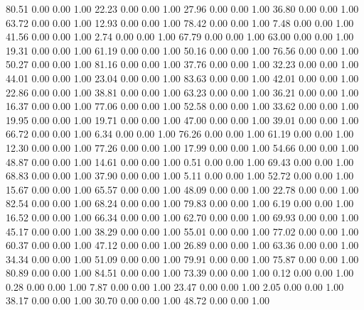    80.51   0.00   0.00   1.00
   22.23   0.00   0.00   1.00
   27.96   0.00   0.00   1.00
   36.80   0.00   0.00   1.00
   63.72   0.00   0.00   1.00
   12.93   0.00   0.00   1.00
   78.42   0.00   0.00   1.00
    7.48   0.00   0.00   1.00
   41.56   0.00   0.00   1.00
    2.74   0.00   0.00   1.00
   67.79   0.00   0.00   1.00
   63.00   0.00   0.00   1.00
   19.31   0.00   0.00   1.00
   61.19   0.00   0.00   1.00
   50.16   0.00   0.00   1.00
   76.56   0.00   0.00   1.00
   50.27   0.00   0.00   1.00
   81.16   0.00   0.00   1.00
   37.76   0.00   0.00   1.00
   32.23   0.00   0.00   1.00
   44.01   0.00   0.00   1.00
   23.04   0.00   0.00   1.00
   83.63   0.00   0.00   1.00
   42.01   0.00   0.00   1.00
   22.86   0.00   0.00   1.00
   38.81   0.00   0.00   1.00
   63.23   0.00   0.00   1.00
   36.21   0.00   0.00   1.00
   16.37   0.00   0.00   1.00
   77.06   0.00   0.00   1.00
   52.58   0.00   0.00   1.00
   33.62   0.00   0.00   1.00
   19.95   0.00   0.00   1.00
   19.71   0.00   0.00   1.00
   47.00   0.00   0.00   1.00
   39.01   0.00   0.00   1.00
   66.72   0.00   0.00   1.00
    6.34   0.00   0.00   1.00
   76.26   0.00   0.00   1.00
   61.19   0.00   0.00   1.00
   12.30   0.00   0.00   1.00
   77.26   0.00   0.00   1.00
   17.99   0.00   0.00   1.00
   54.66   0.00   0.00   1.00
   48.87   0.00   0.00   1.00
   14.61   0.00   0.00   1.00
    0.51   0.00   0.00   1.00
   69.43   0.00   0.00   1.00
   68.83   0.00   0.00   1.00
   37.90   0.00   0.00   1.00
    5.11   0.00   0.00   1.00
   52.72   0.00   0.00   1.00
   15.67   0.00   0.00   1.00
   65.57   0.00   0.00   1.00
   48.09   0.00   0.00   1.00
   22.78   0.00   0.00   1.00
   82.54   0.00   0.00   1.00
   68.24   0.00   0.00   1.00
   79.83   0.00   0.00   1.00
    6.19   0.00   0.00   1.00
   16.52   0.00   0.00   1.00
   66.34   0.00   0.00   1.00
   62.70   0.00   0.00   1.00
   69.93   0.00   0.00   1.00
   45.17   0.00   0.00   1.00
   38.29   0.00   0.00   1.00
   55.01   0.00   0.00   1.00
   77.02   0.00   0.00   1.00
   60.37   0.00   0.00   1.00
   47.12   0.00   0.00   1.00
   26.89   0.00   0.00   1.00
   63.36   0.00   0.00   1.00
   34.34   0.00   0.00   1.00
   51.09   0.00   0.00   1.00
   79.91   0.00   0.00   1.00
   75.87   0.00   0.00   1.00
   80.89   0.00   0.00   1.00
   84.51   0.00   0.00   1.00
   73.39   0.00   0.00   1.00
    0.12   0.00   0.00   1.00
    0.28   0.00   0.00   1.00
    7.87   0.00   0.00   1.00
   23.47   0.00   0.00   1.00
    2.05   0.00   0.00   1.00
   38.17   0.00   0.00   1.00
   30.70   0.00   0.00   1.00
   48.72   0.00   0.00   1.00
